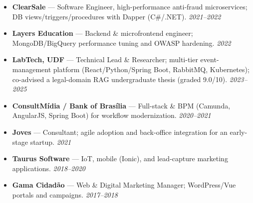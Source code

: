 \documentclass[10pt,a4paper]{altacv}
\begin{document}
\vspace{2mm}
\begin{itemize}
\setlength{\itemindent}{0.5em}
\item[--] \textbf{ClearSale} — Software Engineer, high-performance anti-fraud microservices; DB views/triggers/procedures with Dapper (C\#/.NET). \emph{2021--2022}
\item[--] \textbf{Layers Education} — Backend \& microfrontend engineer; MongoDB/BigQuery performance tuning and OWASP hardening. \emph{2022}
\item[--] \textbf{LabTech, UDF} — Technical Lead \& Researcher; multi-tier event-management platform (React/Python/Spring Boot, RabbitMQ, Kubernetes); co-advised a legal-domain RAG undergraduate thesis (graded 9.0/10). \emph{2023--2025}
\item[--] \textbf{ConsultMídia / Bank of Brasília} — Full-stack \& BPM (Camunda, AngularJS, Spring Boot) for workflow modernization. \emph{2020--2021}
\item[--] \textbf{Joves} — Consultant; agile adoption and back-office integration for an early-stage startup. \emph{2021}
\item[--] \textbf{Taurus Software} — IoT, mobile (Ionic), and lead-capture marketing applications. \emph{2018--2020}
\item[--] \textbf{Gama Cidadão} — Web \& Digital Marketing Manager; WordPress/Vue portals and campaigns. \emph{2017--2018}
\end{itemize}
\end{document}
